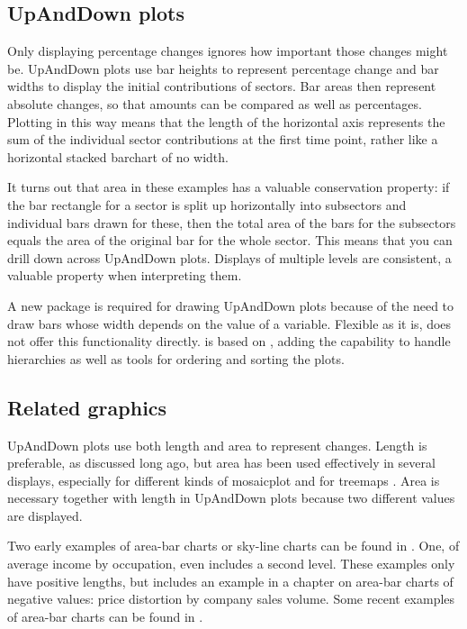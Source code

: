 \hypertarget{upanddown-plots}{%
\subsection{UpAndDown plots}\label{upanddown-plots}}

Only displaying percentage changes ignores how important those changes might be. UpAndDown plots use bar heights to represent percentage change and bar widths to display the initial contributions of sectors. Bar areas then represent absolute changes, so that amounts can be compared as well as percentages. Plotting in this way means that the length of the horizontal axis represents the sum of the individual sector contributions at the first time point, rather like a horizontal stacked barchart of no width.

It turns out that area in these examples has a valuable conservation property: if the bar rectangle for a sector is split up horizontally into subsectors and individual bars drawn for these, then the total area of the bars for the subsectors equals the area of the original bar for the whole sector. This means that you can drill down across UpAndDown plots. Displays of multiple levels are consistent, a valuable property when interpreting them.

A new package is required for drawing UpAndDown plots because of the need to draw bars whose width depends on the value of a variable. Flexible as it is,  does not offer this functionality directly.  is based on , adding the capability to handle hierarchies as well as tools for ordering and sorting the plots.

\hypertarget{related-graphics}{%
\subsection{Related graphics}\label{related-graphics}}

UpAndDown plots use both length and area to represent changes. Length is preferable, as \citet{cleveland:1987} discussed long ago, but area has been used effectively in several displays, especially for different kinds of mosaicplot \citep{hofmann:2003} and for treemaps \citep{shneiderman:1992}. Area is necessary together with length in UpAndDown plots because two different values are displayed.

Two early examples of area-bar charts or sky-line charts can be found in \citet{karsten:1923}. One, of average income by occupation, even includes a second level. These examples only have positive lengths, but \citet{brinton:1939} includes an example in a chapter on area-bar charts of negative values: price distortion by company sales volume. Some recent examples of area-bar charts can be found in \citet{mackay:2009}.

